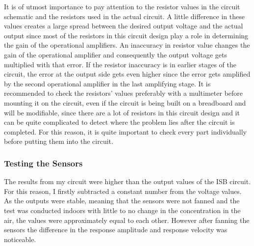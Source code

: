 It is of utmost importance to pay attention to the resistor values in the circuit schematic and the resistors used in the actual circuit. A little difference in these values creates a large spread between the desired output voltage and the actual output since most of the resistors in this circuit design play a role in determining the gain of the operational amplifiers. An inaccuracy in resistor value changes the gain of the operational amplifier and consequently the output voltage gets multiplied with that error. If the resistor inaccuracy is in earlier stages of the circuit, the error at the output side gets even higher since the error gets amplified by the second operational amplifier in the last amplifying stage. It is recommended to check the resistors' values preferably with a multimeter before mounting it on the circuit, even if the circuit is being built on a breadboard and will be modifiable, since there are a lot of resistors in this circuit design and it can be quite complicated to detect where the problem lies after the circuit is completed. For this reason, it is quite important to check every part individually before putting them into the circuit. \par 




\subsubsection{Testing the Sensors}
The results from my circuit were higher than the output values of the ISB circuit. For this reason, I firstly subtracted a constant number from the voltage values. As the outputs were stable, meaning that the sensors were not fanned and the test was conducted indoors with little to no change in the  concentration in the air, the values were approximately equal to each other. However after fanning the sensors the difference in the response amplitude and response velocity was noticeable. 